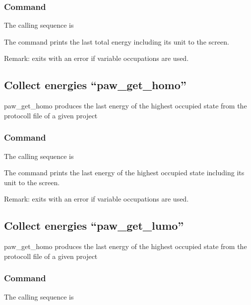 \documentclass[final,12pt]{article}
\begin{document}
{{{%
\subsubsection{Command}
The calling sequence is

\bigskip{}

The command prints the last total energy including its unit to the
screen.

Remark: exits with an error if variable occupations are used.

\subsection{Collect energies ``paw\_get\_homo''}
paw\_get\_homo produces the last energy of the highest occupied state
from the protocoll file of a given project

\subsubsection{Command}
The calling sequence is

\bigskip{}

The command prints the last energy of the highest occupied state
including its unit to the screen.

Remark: exits with an error if variable occupations are used.

\subsection{Collect energies ``paw\_get\_lumo''}
paw\_get\_homo produces the last energy of the highest occupied state
from the protocoll file of a given project

\subsubsection{Command}
The calling sequence is

}}}
\end{document}
